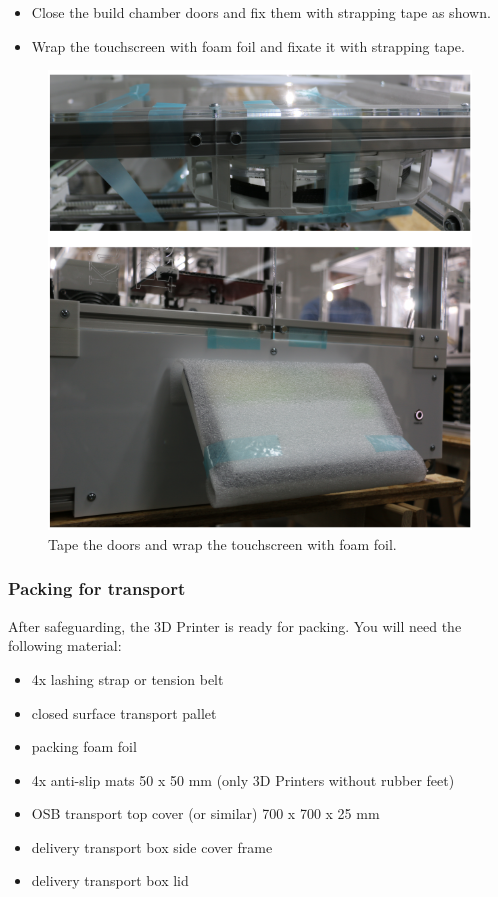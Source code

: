 \begin{itemize}
  \item Close the build chamber doors and fix them with strapping tape as shown.
  \item Wrap the touchscreen with foam foil and fixate it with strapping tape.
\end{itemize}


\begin{figure}[H]
  \centering
  \includegraphics[width=.7\linewidth]{./img/secure_doors_gui.png}
  \caption{Tape the doors and wrap the touchscreen with foam foil.}
\end{figure}


\subsubsection{Packing for transport}

After safeguarding, the 3D Printer is ready for packing. You will need the following material:

\begin{itemize}
  \item 4x lashing strap or tension belt
  \item closed surface transport pallet
  \item packing foam foil
  \item 4x anti-slip mats 50 x 50 mm (only 3D Printers without rubber feet)
  \item OSB transport top cover (or similar) 700 x 700 x 25 mm
  \item delivery transport box side cover frame
  \item delivery transport box lid
\end{itemize}

